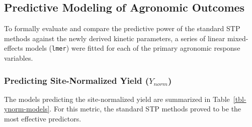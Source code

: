 \documentclass[
  a4paper,
]{article}
\begin{document}
\subsection{Predictive Modeling of Agronomic
Outcomes}\label{sec-agronomic-modeling}

To formally evaluate and compare the predictive power of the standard
STP methods against the newly derived kinetic parameters, a series of
linear mixed-effects models (\texttt{lmer}) were fitted for each of the
primary agronomic response variables.

\subsubsection{\texorpdfstring{Predicting Site-Normalized Yield
(\(Y_{norm}\))}{Predicting Site-Normalized Yield (Y\_\{norm\})}}\label{sec-ynorm}

The models predicting the site-normalized yield are summarized in
Table~\ref{tbl-ynorm-models}. For this metric, the standard STP methods
proved to be the most effective predictors.
\end{document}

